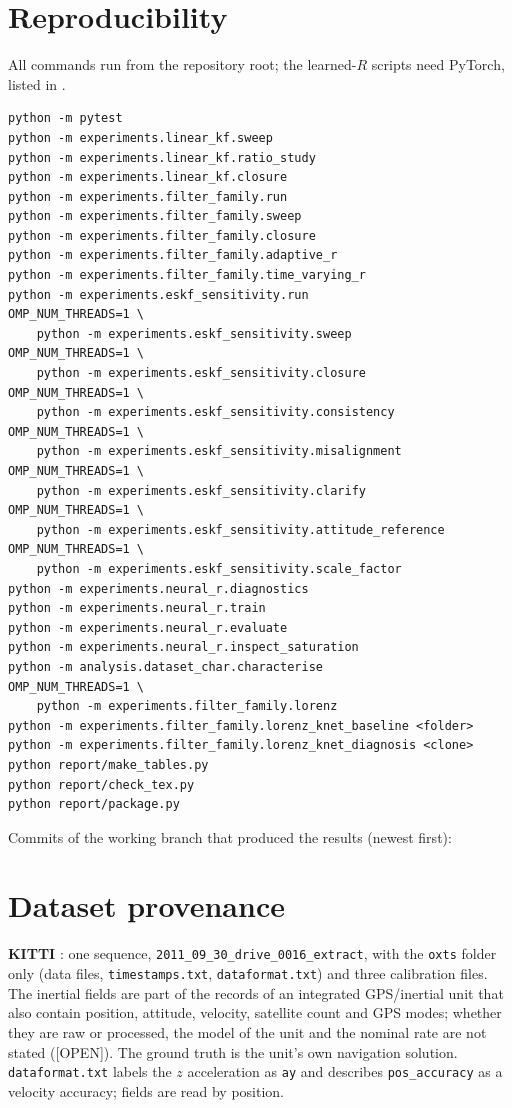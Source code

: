 \documentclass[11pt,a4paper]{article}
\newcommand{\openlbl}{\textsc{[OPEN]}}
\begin{document}
\section{Reproducibility}\label{app:repro}
All commands run from the repository root; the learned-$R$ scripts need PyTorch, listed in
.
\begin{verbatim}
python -m pytest
python -m experiments.linear_kf.sweep
python -m experiments.linear_kf.ratio_study
python -m experiments.linear_kf.closure
python -m experiments.filter_family.run
python -m experiments.filter_family.sweep
python -m experiments.filter_family.closure
python -m experiments.filter_family.adaptive_r
python -m experiments.filter_family.time_varying_r
python -m experiments.eskf_sensitivity.run
OMP_NUM_THREADS=1 \
    python -m experiments.eskf_sensitivity.sweep
OMP_NUM_THREADS=1 \
    python -m experiments.eskf_sensitivity.closure
OMP_NUM_THREADS=1 \
    python -m experiments.eskf_sensitivity.consistency
OMP_NUM_THREADS=1 \
    python -m experiments.eskf_sensitivity.misalignment
OMP_NUM_THREADS=1 \
    python -m experiments.eskf_sensitivity.clarify
OMP_NUM_THREADS=1 \
    python -m experiments.eskf_sensitivity.attitude_reference
OMP_NUM_THREADS=1 \
    python -m experiments.eskf_sensitivity.scale_factor
python -m experiments.neural_r.diagnostics
python -m experiments.neural_r.train
python -m experiments.neural_r.evaluate
python -m experiments.neural_r.inspect_saturation
python -m analysis.dataset_char.characterise
OMP_NUM_THREADS=1 \
    python -m experiments.filter_family.lorenz
python -m experiments.filter_family.lorenz_knet_baseline <folder>
python -m experiments.filter_family.lorenz_knet_diagnosis <clone>
python report/make_tables.py
python report/check_tex.py
python report/package.py
\end{verbatim}
Commits of the working branch that produced the results (newest first):


\section{Dataset provenance}\label{app:data}
\textbf{KITTI} \citep{geiger2013}: one sequence, \texttt{2011\_09\_30\_drive\_0016\_extract}, with the
\texttt{oxts} folder only (data files, \texttt{timestamps.txt}, \texttt{dataformat.txt}) and three
calibration files. The inertial fields are part of the records of an integrated GPS/inertial unit
that also contain position, attitude, velocity, satellite count and GPS modes; whether they are raw or
processed, the model of the unit and the nominal rate are not stated (\openlbl). The ground truth is
the unit's own navigation solution. \texttt{dataformat.txt} labels the $z$ acceleration as
\texttt{ay} and describes \texttt{pos\_accuracy} as a velocity accuracy; fields are read by position.
\end{document}
